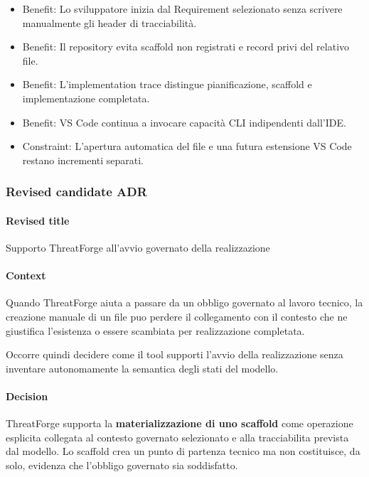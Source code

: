 \documentclass[
  10pt,
]{article}
\providecommand{\tightlist}{%
  \setlength{\itemsep}{0pt}\setlength{\parskip}{0pt}}
\begin{document}
\begin{itemize}
\tightlist
\item
  Benefit: Lo sviluppatore inizia dal Requirement selezionato senza
  scrivere manualmente gli header di tracciabilità.
\item
  Benefit: Il repository evita scaffold non registrati e record privi
  del relativo file.
\item
  Benefit: L'implementation trace distingue pianificazione, scaffold e
  implementazione completata.
\item
  Benefit: VS Code continua a invocare capacità CLI indipendenti
  dall'IDE.
\item
  Constraint: L'apertura automatica del file e una futura estensione VS
  Code restano incrementi separati.
\end{itemize}

\subsubsection{Revised candidate ADR}\label{revised-candidate-adr-11}

\paragraph{Revised title}\label{revised-title-11}

Supporto ThreatForge all'avvio governato della realizzazione

\paragraph{Context}\label{context-23}

Quando ThreatForge aiuta a passare da un obbligo governato al lavoro
tecnico, la creazione manuale di un file puo perdere il collegamento con
il contesto che ne giustifica l'esistenza o essere scambiata per
realizzazione completata.

Occorre quindi decidere come il tool supporti l'avvio della
realizzazione senza inventare autonomamente la semantica degli stati del
modello.

\paragraph{Decision}\label{decision-23}

ThreatForge supporta la \textbf{materializzazione di uno scaffold} come
operazione esplicita collegata al contesto governato selezionato e alla
tracciabilita prevista dal modello. Lo scaffold crea un punto di
partenza tecnico ma non costituisce, da solo, evidenza che l'obbligo
governato sia soddisfatto.
\end{document}
